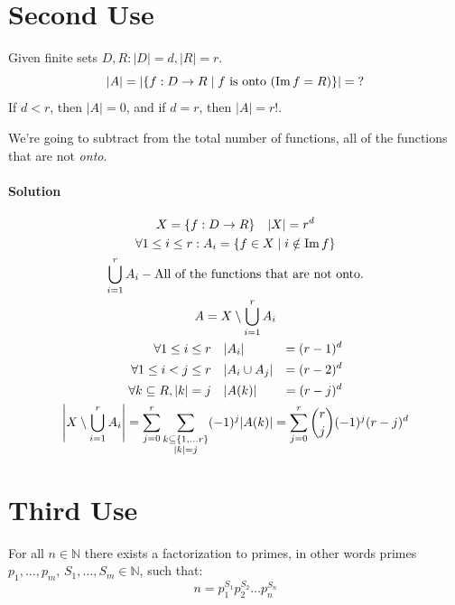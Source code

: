\documentclass[00_complete]{subfiles}
\begin{document}
\section{Second Use}
Given finite sets $D,R: |D|=d, |R|=r$.
$$|A|=|\{f:D\to R \mid f \text{ is onto } (\operatorname{Im} f=R) \}|=\; ?$$
If $d<r$, then $|A|=0$, and if $d=r$, then $|A|=r!$.

We're going to subtract from the total number of functions, all of the
functions that are not \emph{onto}.

\paragraph{Solution}
\begin{gather*}
\begin{gathered}
    X=\{f:D\to R\} \quad |X|=r^d\\
    \forall 1\leq i \leq r: A_i = \{f \in X \mid i \notin \operatorname{Im} f\} \\
    \bigcup_{i=1}^rA_i - \text{All of the functions that are not onto.} \\
    A = X \setminus \bigcup_{i=1}^rA_i\\
\end{gathered} \\
\begin{aligned}
    \forall 1 \leq i \leq r \quad &|A_i|&=(r-1)^d \\
    \forall 1 \leq i<j \leq r \quad &|A_i\cup A_j|&=(r-2)^d \\
    \forall k \subseteq R, |k|=j \quad &|A(k)|&=(r-j)^d
\end{aligned} \\
\begin{gathered}
    \left|X \setminus \bigcup_{i=1}^rA_i\right| =
    \sum_{j=0}^{r}\sum_{\begin{subarray}{c}k \subseteq \{1,\dots
    r\}\\|k|=j\end{subarray}}(-1)^j|A(k)| =
    \sum_{j=0}^{r}\binom{r}{j}(-1)^j(r-j)^d
\end{gathered}
\end{gather*}

\section{Third Use}

\begin{claim}
    For all $n \in \mathbb{N}$ there exists a factorization to primes, in
    other words primes $p_1,\dots,p_m$, $S_1,\dots,S_m\in \mathbb{N}$, such
    that:
    $$n=p_1^{S_1}p_2^{S_2}\dots p_n^{S_n}$$
\end{claim}
\end{document}
